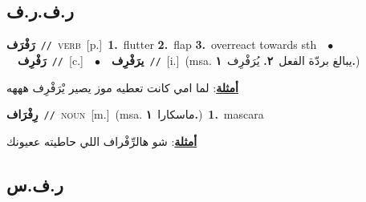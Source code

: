 \documentclass[10pt,a4paper,twoside]{article} %
\begin{document}
\begin{multicols}{2}
\vspace{-3mm}
\subsection*{\color{blue}\foreignlanguage{arabic}{ر.ف.ر.ف}\color{blue}{}} 

{\setlength\topsep{0pt}\textbf{\foreignlanguage{arabic}{رَفْرَف}}\ {\color{gray}\texttt{//}\color{black}}\ \textsc{verb}\ [p.]\ \textbf{1.}~flutter  \textbf{2.}~flap  \textbf{3.}~overreact towards sth\ \ $\bullet$\ \ \setlength\topsep{0pt}\textbf{\foreignlanguage{arabic}{رَفْرِف}}\ {\color{gray}\texttt{//}\color{black}}\ [c.]\ \ $\bullet$\ \ \setlength\topsep{0pt}\textbf{\foreignlanguage{arabic}{يرَفْرِف}}\ {\color{gray}\texttt{//}\color{black}}\ [i.]\ \color{gray}(msa. \foreignlanguage{arabic}{يبالغ بردّة الفعل}~\foreignlanguage{arabic}{\textbf{٢.}}  \foreignlanguage{arabic}{يُرَفْرِف}~\foreignlanguage{arabic}{\textbf{١.}})\color{black}\  \begin{flushright}\color{gray}\foreignlanguage{arabic}{\textbf{\underline{\foreignlanguage{arabic}{أمثلة}}}: لما امي كانت تعطيه موز يصير يْرَفْرِف هههه}\end{flushright}\color{black}} \vspace{2mm}

{\setlength\topsep{0pt}\textbf{\foreignlanguage{arabic}{رِفْرَاف}}\ {\color{gray}\texttt{//}\color{black}}\ \textsc{noun}\ [m.]\ \color{gray}(msa. \foreignlanguage{arabic}{ماسكارا}~\foreignlanguage{arabic}{\textbf{١.}})\color{black}\ \textbf{1.}~mascara\  \begin{flushright}\color{gray}\foreignlanguage{arabic}{\textbf{\underline{\foreignlanguage{arabic}{أمثلة}}}: شو هالرِّفْراف اللي حاطيته ععيونك}\end{flushright}\color{black}} \vspace{2mm}

\vspace{-3mm}
\subsection*{\color{blue}\foreignlanguage{arabic}{ر.ف.س}\color{blue}{}} 


\end{multicols}
\end{document}
